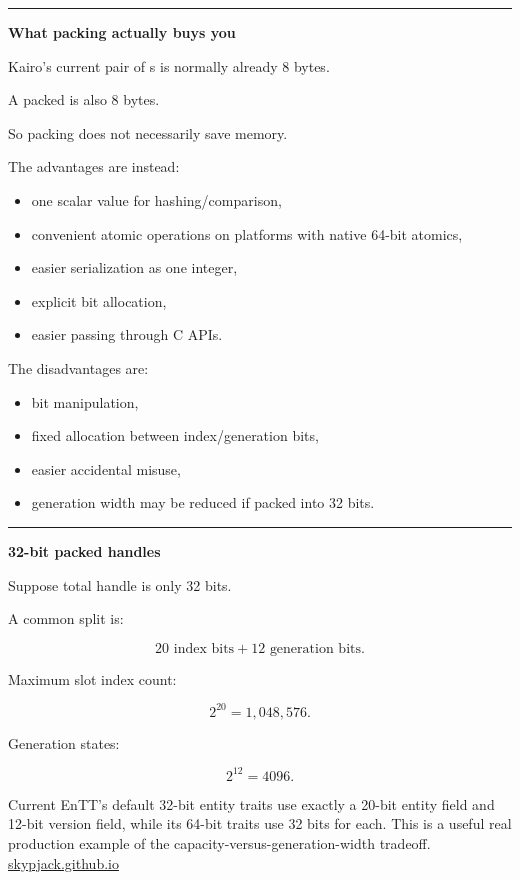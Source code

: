 \begin{center}\rule{0.5\linewidth}{0.5pt}\end{center}

\textbf{What packing actually buys you}

Kairo's current pair of s is normally already 8 bytes.

A packed  is also 8 bytes.

So packing does not necessarily save memory.

The advantages are instead:

\begin{itemize}
\tightlist
\item
  one scalar value for hashing/comparison,
\item
  convenient atomic operations on platforms with native 64-bit atomics,
\item
  easier serialization as one integer,
\item
  explicit bit allocation,
\item
  easier passing through C APIs.
\end{itemize}

The disadvantages are:

\begin{itemize}
\tightlist
\item
  bit manipulation,
\item
  fixed allocation between index/generation bits,
\item
  easier accidental misuse,
\item
  generation width may be reduced if packed into 32 bits.
\end{itemize}

\begin{center}\rule{0.5\linewidth}{0.5pt}\end{center}

\textbf{32-bit packed handles}

Suppose total handle is only 32 bits.

A common split is:

\[
20\text{ index bits}
+
12\text{ generation bits}.
\]

Maximum slot index count:

\[
2^{20}
=
1,048,576.
\]

Generation states:

\[
2^{12}
=
4096.
\]

Current EnTT's default 32-bit entity traits use exactly a 20-bit entity field and 12-bit version field, while its 64-bit traits use 32 bits for each. This is a useful real production example of the capacity-versus-generation-width tradeoff. \href{https://skypjack.github.io/entt/entity_8hpp_source.html?utm_source=chatgpt.com}{skypjack.github.io}

